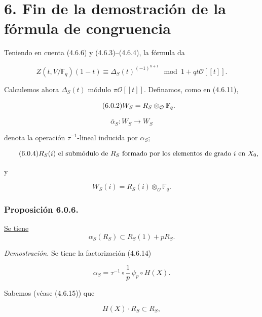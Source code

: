 \section*{6. Fin de la demostración de la fórmula de congruencia}

Teniendo en cuenta (4.6.6) y (4.6.3)--(4.6.4), la fórmula
 da

\begin{equation}\tag{6.0.1}
Z(t,V/\mathbb F_q)(1-t)
\equiv\Delta_S(t)^{(-1)^{n+1}}
\mod{1+qt\mathcal O[[t]]}.
\end{equation}

Calculemos ahora $\Delta_S(t)$ módulo $\pi\mathcal O[[t]]$. Definamos,
como en (4.6.11),

\begin{equation}\tag{6.0.2}
W_S=\sisi{R_B}{R_S}\otimes_{\mathcal O}\mathbb F_q.
\end{equation}

\pageoriginale

\begin{equation}\tag{6.0.3}
\bar\alpha_S:W_S\longrightarrow W_S
\end{equation}

denota la operación $\tau^{-1}$-lineal inducida por $\alpha_S$;

\begin{equation}\tag{6.0.4}
\sisi{R_S(t)}{R_S(i)}
\text{ el submódulo de $R_S$ formado por los elementos de grado $i$ en
$X_0$},
\end{equation}

y

\begin{equation}\tag{6.0.5}
W_S(i)=R_S(i)\otimes_{\mathcal O}\mathbb F_q.
\end{equation}

\subsubsection*{Proposición 6.0.6.}
\underline{Se tiene}
\[
\alpha_S(R_S)\subset R_S(1)+pR_S.
\]

\noindent\emph{Demostración.}
Se tiene la factorización (4.6.14)

\begin{equation}\tag{6.0.7}
\alpha_S=\tau^{-1}\circ\frac1p\,\psi_p\circ H(X).
\end{equation}

Sabemos (véase (4.6.15)) que

\begin{equation}\tag{6.0.8}
H(X)\cdot R_S\subset R_S,
\end{equation}

